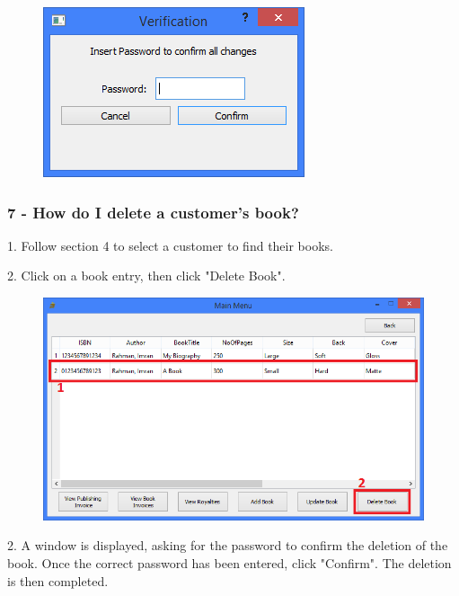 \begin{figure}[H]
    \includegraphics[width=\textwidth]{./Manual/Tutorial/Q6/Verification.png}
\end{figure}

\subsubsection{7 -  How do I delete a customer's book?} \label{sssec:Q7}

1. Follow section 4 to select a customer to find their books.

2. Click on a book entry, then click "Delete Book".

\begin{figure}[H]
    \includegraphics[width=\textwidth]{./Manual/Tutorial/Q7/DeleteBook.png}
\end{figure}

2. A window is displayed, asking for the password to confirm the deletion of the book. Once the correct password has been entered, click "Confirm". The deletion is then completed.

